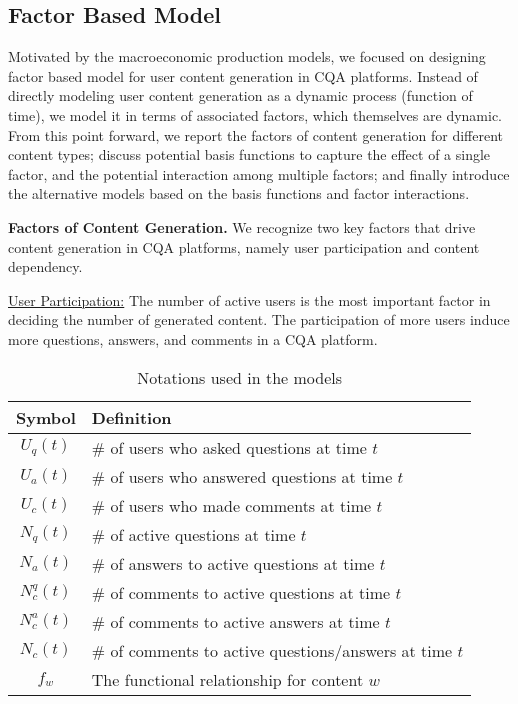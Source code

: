 \subsection{Factor Based Model} 
Motivated by the macroeconomic production models, we focused on designing factor based model for user content generation in CQA platforms. Instead of directly modeling user content generation as a dynamic process (function of time), we model it in terms of associated factors, which themselves are dynamic. From this point forward, we report the factors of content generation for different content types; discuss potential basis functions to capture the effect of a single factor, and the potential interaction among multiple factors; and finally introduce the alternative models based on the basis functions and factor interactions.

\textbf{Factors of Content Generation.} We recognize two key factors that drive content generation in CQA platforms, namely user participation and content dependency.

\uline{User Participation:} The number of active users is the most important factor in deciding the number of generated content. The participation of more users induce more questions, answers, and comments in a CQA platform.

\begin{table}[thb]
	\centering
	\begin{tabular}{cl}
	\hline
	\textbf{Symbol} & \textbf{Definition}\\ \hline
	$U_q(t)$ & \# of users who asked questions at time $t$\\ 
	$U_a(t)$ & \# of users who answered questions at time $t$\\
	$U_c(t)$ & \# of users who made comments at time $t$\\
	$N_q(t)$ & \# of active questions at time $t$\\
	$N_a(t)$ & \# of answers to active questions at time $t$\\
	$N_c^q(t)$ & \# of comments to active questions at time $t$\\
	$N_c^a(t)$ & \# of comments to active answers at time $t$\\
    $N_c(t)$ & \# of comments to active questions/answers at time $t$\\
	$f_w$ & The functional relationship for content $w$\\ \hline
	 \end{tabular}
    \caption{Notations used in the models}
    \label{notations}
\end{table}

